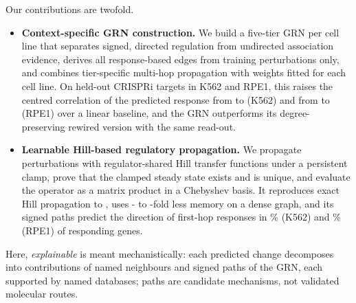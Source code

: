 Our contributions are twofold.
\begin{itemize}
\item \textbf{Context-specific GRN construction.} We build a five-tier GRN per cell line that separates signed, directed regulation from undirected association evidence, derives all response-based edges from training perturbations only, and combines tier-specific multi-hop propagation with weights fitted for each cell line.
On  held-out CRISPRi targets in K562 and RPE1, this raises the centred correlation of the predicted response from  to  (K562) and from  to  (RPE1) over a linear baseline, and the GRN outperforms its degree-preserving rewired version with the same read-out.
\item \textbf{Learnable Hill-based regulatory propagation.} We propagate perturbations with regulator-shared Hill transfer functions under a persistent clamp, prove that the clamped steady state exists and is unique, and evaluate the operator as a matrix product in a Chebyshev basis.
It reproduces exact Hill propagation to , uses - to -fold less memory on a dense graph, and its signed paths predict the direction of first-hop responses in \% (K562) and \% (RPE1) of responding genes.
\end{itemize}
Here, \emph{explainable} is meant mechanistically: each predicted change decomposes into contributions of named neighbours and signed paths of the GRN, each supported by named databases; paths are candidate mechanisms, not validated molecular routes.
